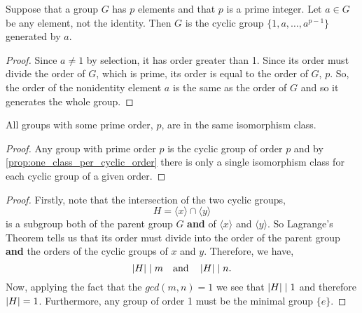 \documentclass[MathsNotesBase.tex]{subfiles}
\begin{document}
{	\medskip
	\begin{corollary}
		\label{coro:prime_order_groups_are_cyclic}
		Suppose that a group $G$ has $p$ elements and that $p$ is a prime integer. Let $a \in G$ be any element, not the identity. Then $G$ is the cyclic group $\{1, a, \dots , a^{p-1}\}$ generated by $a$.
	\end{corollary}
	\begin{proof}
		Since $a \neq 1$ by selection, it has order greater than 1. Since its order must divide the order of $G$, which is prime, its order is equal to the order of $G$, $p$. So, the order of the nonidentity element $a$ is the same as the order of $G$ and so it generates the whole group.
	\end{proof}

	\medskip
	\begin{corollary}
		All groups with some prime order, $p$, are in the same isomorphism class.
	\end{corollary}
	\begin{proof}
		Any group with prime order $p$ is the cyclic group of order $p$ and by \autoref{prop:one_class_per_cyclic_order} there is only a single isomorphism class for each cyclic group of a given order.
	\end{proof}

	\bigskip
	\begin{proof}	
		Firstly, note that the intersection of the two cyclic groups,
		\[ H = \langle x \rangle \cap \langle y \rangle \]
		is a subgroup both of the parent group $G$ \textbf{and} of ${ \langle x \rangle }$ and ${ \langle y \rangle }$. So Lagrange's Theorem tells us that its order must divide into the order of the parent group \textbf{and} the orders of the cyclic groups of $x$ and $y$. Therefore, we have,
		\[ \left\lvert H\right\rvert \mid m \hspace{10pt}\text{and}\hspace{10pt} \left\lvert H\right\rvert \mid n. \]
		Now, applying the fact that the ${ gcd(m,n) = 1 }$ we see that ${ \left\lvert H\right\rvert \mid 1 }$ and therefore ${ \left\lvert H\right\rvert = 1 }$. Furthermore, any group of order 1 must be the minimal group ${ \{e\} }$.		
	\end{proof}

}
\end{document}
